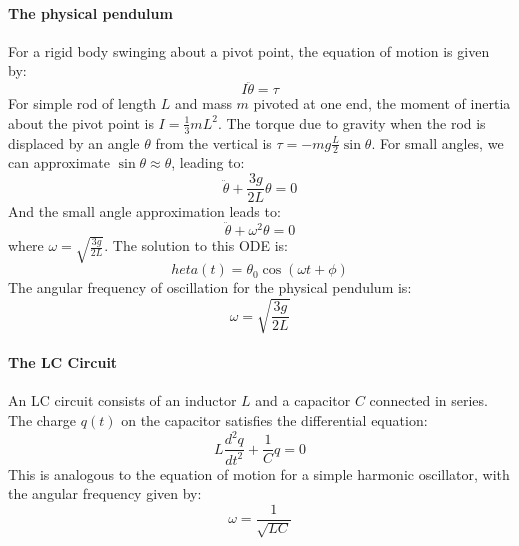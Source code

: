 \documentclass[11pt]{report}
\begin{document}
\paragraph{The physical pendulum} For a rigid body swinging about a pivot point, the equation of motion is given by:
\begin{equation}\label{eq:physical_tau}
    I\ddot{\theta} = \tau
\end{equation}
For simple rod of length \( L \) and mass \( m \) pivoted at one end, the moment of inertia about the pivot point is \( I = \frac{1}{3}mL^2 \). The torque due to gravity when the rod is displaced by an angle \( \theta \) from the vertical is \( \tau = -mg\tfrac{L}{2}\sin\theta \). For small angles, we can approximate \( \sin\theta \approx \theta \), leading to:
\begin{equation}\label{eq:physical_small}
    \ddot{\theta} + \frac{3g}{2L}\theta = 0
\end{equation}
And the small angle approximation leads to:
\begin{equation}\label{eq:physical_omega_form}
    \ddot{\theta} + \omega^2 \theta = 0
\end{equation}
where \( \omega = \sqrt{\tfrac{3g}{2L}} \). The solution to this ODE is:
\begin{equation}\label{eq:physical_solution}
    	heta(t) = \theta_0 \cos(\omega t + \phi)
\end{equation}
The angular frequency of oscillation for the physical pendulum is:
\begin{equation}\label{eq:physical_omega}
    \omega = \sqrt{\frac{3g}{2L}}
\end{equation}

\paragraph{The LC Circuit} An LC circuit consists of an inductor \( L \) and a capacitor \( C \) connected in series. The charge \( q(t) \) on the capacitor satisfies the differential equation:
\begin{equation}\label{eq:LC_ode}
    L\frac{d^2q}{dt^2} + \frac{1}{C}q = 0
\end{equation}
This is analogous to the equation of motion for a simple harmonic oscillator, with the angular frequency given by:
\begin{equation}\label{eq:LC_omega}
    \omega = \frac{1}{\sqrt{LC}}
\end{equation}  
\end{document}
